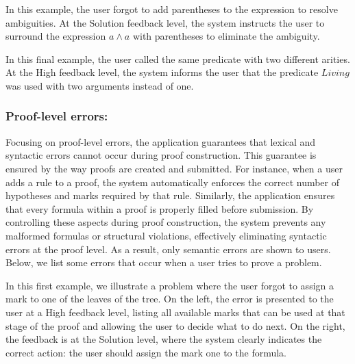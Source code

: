 In this example, the user forgot to add parentheses to the expression to resolve ambiguities. At the Solution feedback level, the system instructs the user to surround the expression \(a \land a\) with parentheses to eliminate the ambiguity.

\begin{center}
\end{center}

In this final example, the user called the same predicate with two different arities. At the High feedback level, the system informs the user that the predicate \(Living\) was used with two arguments instead of one.
\begin{center}
\end{center}

\subsubsection*{Proof-level errors:}
Focusing on proof-level errors, the application guarantees that lexical and syntactic errors cannot occur during proof construction. This guarantee is ensured by the way proofs are created and submitted. For instance, when a user adds a rule to a proof, the system automatically enforces the correct number of hypotheses and marks required by that rule. Similarly, the application ensures that every formula within a proof is properly filled before submission. By controlling these aspects during proof construction, the system prevents any malformed formulas or structural violations, effectively eliminating syntactic errors at the proof level. As a result, only semantic errors are shown to users. Below, we list some errors that occur when a user tries to prove a problem.

\vspace{1em}

In this first example, we illustrate a problem where the user forgot to assign a mark to one of the leaves of the tree. On the left, the error is presented to the user at a High feedback level, listing all available marks that can be used at that stage of the proof and allowing the user to decide what to do next. On the right, the feedback is at the Solution level, where the system clearly indicates the correct action: the user should assign the mark one to the formula.

